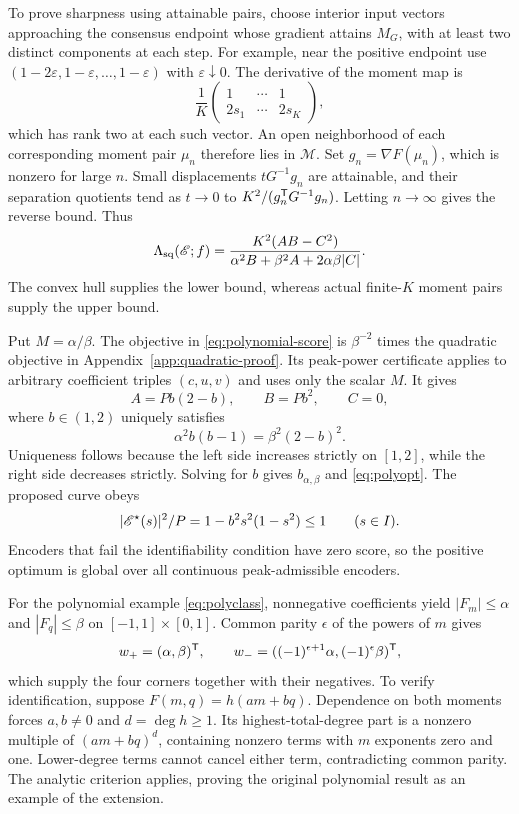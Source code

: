 To prove sharpness using attainable pairs, choose interior input vectors approaching the consensus endpoint whose gradient attains $M_G$, with at least two distinct components at each step. For example, near the positive endpoint use $(1-2\varepsilon,1-\varepsilon,\ldots,1-\varepsilon)$ with $\varepsilon\downarrow0$. The derivative of the moment map is
$$
 \frac1K\begin{pmatrix}1&\cdots&1\\2s_1&\cdots&2s_K\end{pmatrix},
$$
which has rank two at each such vector. An open neighborhood of each corresponding moment pair $\mu_n$ therefore lies in $\mathcal M$. Set $g_n=\nabla F(\mu_n)$, which is nonzero for large $n$. Small displacements $tG^{-1}g_n$ are attainable, and their separation quotients tend as $t\to0$ to $K^2/(g_n^\mathsf T G^{-1}g_n)$. Letting $n\to\infty$ gives the reverse bound. Thus
\begin{equation}
 \Lambda_{\mathrm{sq}}(\mathscr E;f)
 =\frac{K^2(AB-C^2)}{\alpha^2B+\beta^2A+2\alpha\beta|C|}.
 \label{eq:polynomial-score}
\end{equation}
The convex hull supplies the lower bound, whereas actual finite-$K$ moment pairs supply the upper bound.

Put $M=\alpha/\beta$. The objective in \eqref{eq:polynomial-score} is $\beta^{-2}$ times the quadratic objective in Appendix~\ref{app:quadratic-proof}. Its peak-power certificate applies to arbitrary coefficient triples $(c,u,v)$ and uses only the scalar $M$. It gives
$$
 A=Pb(2-b),\qquad B=Pb^2,\qquad C=0,
$$
where $b\in(1,2)$ uniquely satisfies
$$
 \alpha^2b(b-1)=\beta^2(2-b)^2.
$$
Uniqueness follows because the left side increases strictly on $[1,2]$, while the right side decreases strictly. Solving for $b$ gives $b_{\alpha,\beta}$ and \eqref{eq:polyopt}. The proposed curve obeys
$$
 |\mathscr E^\star(s)|^2/P=1-b^2s^2(1-s^2)\le1
 \qquad(s\in I).
$$
Encoders that fail the identifiability condition have zero score, so the positive optimum is global over all continuous peak-admissible encoders.

For the polynomial example \eqref{eq:polyclass}, nonnegative coefficients yield $|F_m|\le\alpha$ and $|F_q|\le\beta$ on $[-1,1]\times[0,1]$. Common parity $\epsilon$ of the powers of $m$ gives
$$
 w_+=(\alpha,\beta)^\mathsf T,\qquad
 w_-=((-1)^{\epsilon+1}\alpha,(-1)^\epsilon\beta)^\mathsf T,
$$
which supply the four corners together with their negatives. To verify identification, suppose $F(m,q)=h(am+bq)$. Dependence on both moments forces $a,b\ne0$ and $d=\deg h\ge1$. Its highest-total-degree part is a nonzero multiple of $(am+bq)^d$, containing nonzero terms with $m$ exponents zero and one. Lower-degree terms cannot cancel either term, contradicting common parity. The analytic criterion applies, proving the original polynomial result as an example of the extension.

